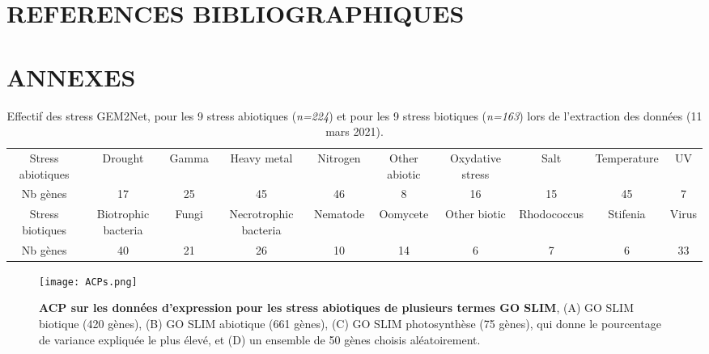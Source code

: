 \documentclass[twoside]{article}
\begin{document}
\newpage
\section{\textbf{REFERENCES BIBLIOGRAPHIQUES}}

\printbibliography


\setcounter{figure}{0}
\renewcommand{\figurename}{Annexe}

\newpage
\section{\textbf{ANNEXES}}

    \begin{table}[!h]
        \centering
        \begin{adjustbox}{max width=\textwidth}
        \begin{tabular}{cccccccccc}
        \hline
           Stress abiotiques & Drought & Gamma & Heavy metal & Nitrogen & Other abiotic & Oxydative stress & Salt & Temperature & UV \\
         Nb gènes & 17 & 25 & 45 & 46 & 8 & 16 & 15 & 45 & 7\\
         \hline
         Stress biotiques & Biotrophic bacteria & Fungi & Necrotrophic bacteria & Nematode & Oomycete & Other biotic & Rhodococcus & Stifenia & Virus\\
         Nb gènes & 40 & 21 & 26 & 10 & 14 & 6 & 7 & 6 & 33\\
         \hline
        \end{tabular}
        \end{adjustbox}
        \caption[]{\label{an:stress}Effectif des stress GEM2Net, pour les 9 stress abiotiques (\textit{n=224}) et pour les 9 stress biotiques (\textit{n=163}) lors de l'extraction des données (11 mars 2021). }
    \end{table}
    

    \begin{figure}[!h]
    \centering
        \texttt{[image: ACPs.png]} 
    \caption[]{\textbf{ACP sur les données d'expression pour les stress abiotiques de plusieurs termes GO SLIM}, (A) GO SLIM biotique (420 gènes), (B) GO SLIM abiotique (661 gènes), (C) GO SLIM photosynthèse (75 gènes), qui donne le pourcentage de variance expliquée le plus élevé, et (D) un ensemble de 50 gènes choisis aléatoirement.\label{an:acp}}
    \end{figure}
    
\end{document}
